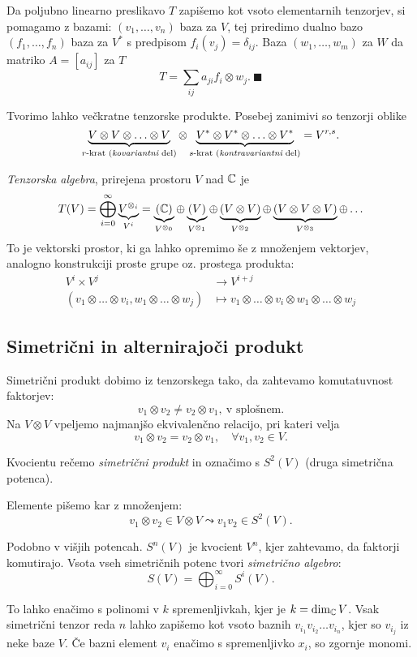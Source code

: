 \ni Da poljubno linearno preslikavo $T$ zapi\v semo kot vsoto elementarnih tenzorjev, si pomagamo z bazami: $(v_1, \ldots, v_n)$ baza za
$V$, tej priredimo dualno bazo $(f_1, \ldots, f_n)$ baza za $V^*$ s predpisom $f_i(v_j) = \delta_{ij}$. Baza $(w_1, \ldots, w_m)$ za
$W$ da matriko $A = [a_{ij}]$ za $T$
\[
	T = \sum_{ij} a_{ji} f_i \otimes w_j.\ \blacksquare
\]

Tvorimo lahko ve\v ckratne tenzorske produkte. Posebej zanimivi so tenzorji oblike
\[
	\underbrace{V \otimes V \otimes \ldots \otimes V}_\text{$r$-krat ({\em kovariantni} del)} \otimes \underbrace{V^* \otimes V^* \otimes \ldots
		\otimes V^*}_\text{$s$-krat ({\em kontravariantni} del)} = V^{r,s}.
\]

\begin{defin}
	\emph{Tenzorska algebra}, prirejena prostoru $V$ nad $\mathbb{C}$ je
	\[
		T(V) = \bigoplus_{i = 0}^\infty \underbrace{V^{\otimes_i}}_{V^i} = \underbrace{(\mathbb{C})}_{V^{\otimes_0}} \oplus
			\underbrace{(V)}_{V^{\otimes_1}} \oplus \underbrace{(V \otimes V)}_{V^{\otimes_2}} \oplus
			 \underbrace{(V \otimes V \otimes V)}_{V^{\otimes_3}} \oplus \ldots
	\]
	To je vektorski prostor, ki ga lahko opremimo \v se z mno\v zenjem vektorjev, analogno konstrukciji proste grupe oz.
	prostega produkta:
	\begin{align*}
		V^i \times V^j &\to V^{i + j} \\
		(v_1 \otimes \ldots \otimes v_i, w_1 \otimes \ldots \otimes w_j) &\mapsto v_1 \otimes \ldots \otimes v_i \otimes w_1
		\otimes \ldots \otimes w_j
	\end{align*}
\end{defin}

\subsection{Simetri\v cni in alternirajo\v ci produkt}

\begin{defin}
Simetri\v cni produkt dobimo iz tenzorskega tako, da zahtevamo komutatuvnost faktorjev:
\[
	v_1 \otimes v_2 \neq v_2 \otimes v_1,\ \text{v splo\v snem}.
\]
Na $V \otimes V$ vpeljemo najmanj\v so ekvivalen\v cno relacijo, pri kateri velja
\[
	v_1 \otimes v_2 = v_2 \otimes v_1, \quad \forall v_1, v_2 \in V.
\]

\ni Kvocientu re\v cemo {\em simetri\v cni produkt} in ozna\v cimo s $S^2 (V)$ (druga simetri\v cna potenca).

\ni Elemente pi\v semo kar z mno\v zenjem:
\[
	v_1 \otimes v_2 \in V \otimes V \leadsto v_1 v_2 \in S^2(V).
\]

\ni Podobno v vi\v sjih potencah. $S^n(V)$ je kvocient $V^n$, kjer zahtevamo, da faktorji komutirajo. Vsota vseh simetri\v cnih
potenc tvori {\em simetri\v cno algebro}:
\[
	S(V) = \bigoplus_{i = 0}^\infty S^i(V).
\]
\end{defin}
To lahko ena\v cimo s polinomi v $k$ spremenljivkah, kjer je $k = \dim_{\mathbb{C}} V$. Vsak simetri\v cni tenzor reda $n$ lahko zapi\v semo
kot vsoto baznih $v_{i_1}v_{i_2}\ldots v_{i_n}$, kjer so $v_{i_j}$ iz neke baze $V$. \v Ce bazni element $v_i$ ena\v cimo s
spremenljivko $x_i$, so zgornje monomi.

